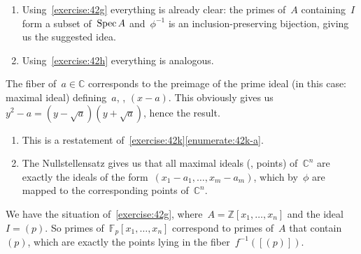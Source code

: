 \begin{exercise}
  \label{exercise:42k}
  \begin{enumerate}
    \item\label{enumerate:42k-a} Using~\autoref{exercise:42g} everything is already clear: the primes of~$A$ containing~$I$ form a subset of~$\operatorname{Spec} A$ and~$\phi^{-1}$ is an inclusion-preserving bijection, giving us the suggested idea.

    \item Using~\autoref{exercise:42h} everything is analogous.
  \end{enumerate}
\end{exercise}

\begin{exercise}
  The fiber of~$a\in\mathbb{C}$ corresponds to the preimage of the prime ideal (in this case: maximal ideal) defining~$a$, \ie, $(x-a)$. This obviously gives us~$y^2-a=(y-\sqrt{a})(y+\sqrt{a})$, hence the result.
\end{exercise}

\begin{exercise}
  \begin{enumerate}
    \item This is a restatement of~\autoref{exercise:42k}\ref{enumerate:42k-a}.

    \item The Nullstellensatz gives us that all maximal ideals (\ie, points) of~$\mathbb{C}^n$ are exactly the ideals of the form~$(x_1-a_1,\ldots,x_m-a_m)$, which by~$\phi$ are mapped to the corresponding points of~$\mathbb{C}^n$.
  \end{enumerate}
\end{exercise}

\begin{exercise}
  We have the situation of~\autoref{exercise:42g}, where~$A=\mathbb{Z}[x_1,\ldots,x_n]$ and the ideal~$I=(p)$. So primes of~$\mathbb{F}_p[x_1,\ldots,x_n]$ correspond to primes of~$A$ that contain~$(p)$, which are exactly the points lying in the fiber~$f^{-1}([(p)])$.
\end{exercise}


